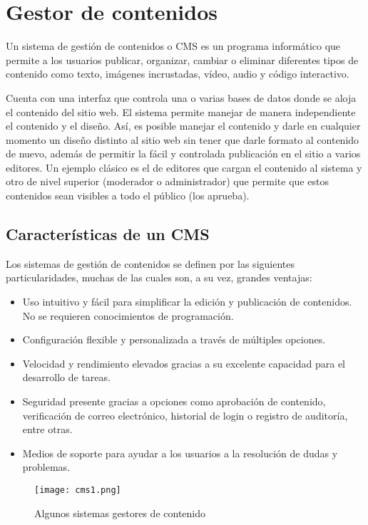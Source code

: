 \section{Gestor de contenidos}

\cite{mdn}Un sistema de gestión de contenidos o CMS es un programa informático que permite a los usuarios publicar, organizar, cambiar o eliminar diferentes tipos de contenido como texto, imágenes incrustadas, vídeo, audio y código interactivo.

\cite{wiki}Cuenta con una interfaz que controla una o varias bases de datos donde se aloja el contenido del sitio web. El sistema permite manejar de manera independiente el contenido y el diseño. Así, es posible manejar el contenido y darle en cualquier momento un diseño distinto al sitio web sin tener que darle formato al contenido de nuevo, además de permitir la fácil y controlada publicación en el sitio a varios editores. Un ejemplo clásico es el de editores que cargan el contenido al sistema y otro de nivel superior (moderador o administrador) que permite que estos contenidos sean visibles a todo el público (los aprueba).

\subsection{Características de un CMS}
Los sistemas de gestión de contenidos se definen por las siguientes particularidades, muchas de las cuales son, a su vez, grandes ventajas:

\begin{itemize}
	\item Uso intuitivo y fácil para simplificar la edición y publicación de contenidos. No se requieren conocimientos de programación.
	\item Configuración flexible y personalizada a través de múltiples opciones.
	\item Velocidad y rendimiento elevados gracias a su excelente capacidad para el desarrollo de tareas.
	\item Seguridad presente gracias a opciones como aprobación de contenido, verificación de correo electrónico, historial de login o registro de auditoría, entre otras.
	\item Medios de soporte para ayudar a los usuarios a la resolución de dudas y problemas.
\end{itemize}

\begin{figure}[H]
	\center
	\texttt{[image: cms1.png]}
	\caption{Algunos sistemas gestores de contenido}
	\label{fig:super}
\end{figure}

